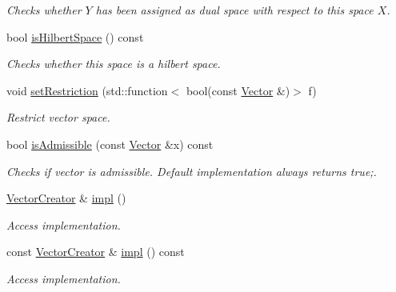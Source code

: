 \begin{DoxyCompactItemize}
\begin{DoxyCompactList}\small\item\em Checks whether $Y$ has been assigned as dual space with respect to this space $X$. \end{DoxyCompactList}\item 
\hypertarget{classSpacy_1_1VectorSpace_a12b023eff0cce202e4a5f9a754cc05c9}{}bool \hyperlink{classSpacy_1_1VectorSpace_a12b023eff0cce202e4a5f9a754cc05c9}{is\+Hilbert\+Space} () const \label{classSpacy_1_1VectorSpace_a12b023eff0cce202e4a5f9a754cc05c9}

\begin{DoxyCompactList}\small\item\em Checks whether this space is a hilbert space. \end{DoxyCompactList}\item 
void \hyperlink{classSpacy_1_1VectorSpace_a7c5f4a8c5937f9e07592483666b20ef7_a7c5f4a8c5937f9e07592483666b20ef7}{set\+Restriction} (std\+::function$<$ bool(const \hyperlink{classSpacy_1_1Vector}{Vector} \&)$>$ f)
\begin{DoxyCompactList}\small\item\em Restrict vector space. \end{DoxyCompactList}\item 
bool \hyperlink{classSpacy_1_1VectorSpace_a4beac78b082a364eb97e938b6c4928d2_a4beac78b082a364eb97e938b6c4928d2}{is\+Admissible} (const \hyperlink{classSpacy_1_1Vector}{Vector} \&x) const 
\begin{DoxyCompactList}\small\item\em Checks if vector is admissible. Default implementation always returns true;. \end{DoxyCompactList}\item 
\hypertarget{classSpacy_1_1Mixin_1_1Impl_a5e61399bae41338a87e701b24b13f52a}{}\hyperlink{group__SpacyGroup_ga1f5316487c031a478247206764bb2efb_ga1f5316487c031a478247206764bb2efb}{Vector\+Creator} \& \hyperlink{classSpacy_1_1Mixin_1_1Impl_a5e61399bae41338a87e701b24b13f52a}{impl} ()\label{classSpacy_1_1Mixin_1_1Impl_a5e61399bae41338a87e701b24b13f52a}

\begin{DoxyCompactList}\small\item\em Access implementation. \end{DoxyCompactList}\item 
\hypertarget{classSpacy_1_1Mixin_1_1Impl_a5107a82d550ed5f6564ffe9155c48fae}{}const \hyperlink{group__SpacyGroup_ga1f5316487c031a478247206764bb2efb_ga1f5316487c031a478247206764bb2efb}{Vector\+Creator} \& \hyperlink{classSpacy_1_1Mixin_1_1Impl_a5107a82d550ed5f6564ffe9155c48fae}{impl} () const\label{classSpacy_1_1Mixin_1_1Impl_a5107a82d550ed5f6564ffe9155c48fae}

\begin{DoxyCompactList}\small\item\em Access implementation. \end{DoxyCompactList}\end{DoxyCompactItemize}


